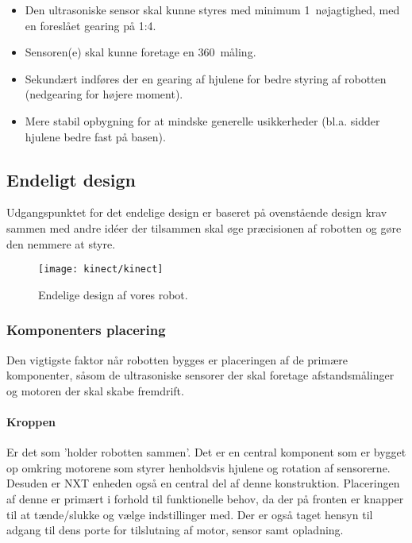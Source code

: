 \begin{itemize}
\item Den ultrasoniske sensor skal kunne styres med  minimum 1\degree~nøjagtighed, med en foreslået gearing på 1:4.
\item Sensoren(e) skal kunne foretage en 360\degree~måling.
\item Sekundært indføres der en gearing af hjulene for bedre styring af robotten (nedgearing for højere moment).
\item Mere stabil opbygning for at mindske generelle usikkerheder (bl.a. sidder hjulene bedre fast på basen).
\end{itemize} 


\subsection{Endeligt design}
Udgangspunktet for det endelige design er baseret på ovenstående design krav sammen med andre idéer der tilsammen skal øge præcisionen af robotten og gøre den nemmere at styre.

\begin{figure}
\centering
\texttt{[image: kinect/kinect]}
\caption{Endelige design af vores robot.}
\label{robot:opbygning}
\end{figure}

\subsubsection{Komponenters placering}

Den vigtigste faktor når robotten bygges er placeringen af de primære komponenter, såsom de ultrasoniske sensorer der skal foretage afstandsmålinger og motoren der skal skabe fremdrift.

\paragraph{Kroppen}
Er det som 'holder robotten sammen'.
Det er en central komponent som er bygget op omkring motorene som styrer henholdsvis hjulene og rotation af sensorerne.
Desuden er NXT enheden også en central del af denne konstruktion.
Placeringen af denne er primært i forhold til funktionelle behov, da der på fronten er knapper til at tænde/slukke og vælge indstillinger med.
Der er også taget hensyn til adgang til dens porte for tilslutning af motor, sensor samt opladning.

